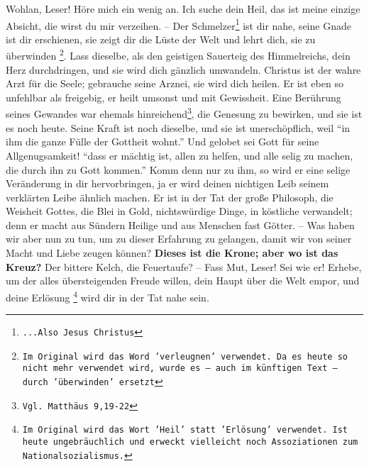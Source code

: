 Wohlan, Leser! Höre mich ein wenig an. Ich suche dein Heil, das ist meine
einzige Absicht, die wirst du mir verzeihen. -- Der Schmelzer\footnote{\texttt{...Also
Jesus Christus}} ist dir nahe, seine Gnade ist dir erschienen, sie zeigt dir die
Lüste der Welt und lehrt dich, sie zu überwinden
\footnote{\texttt{Im Original wird das
Word 'verleugnen' verwendet. Da es heute so nicht mehr verwendet wird, wurde
es -- auch im künftigen Text -- durch 'überwinden' ersetzt}}. Lass dieselbe,
als den geistigen Sauerteig des Himmelreichs, dein Herz durchdringen, und sie
wird dich gänzlich umwandeln. Christus ist der wahre Arzt für die Seele;
gebrauche seine Arznei, sie wird dich heilen. Er ist eben so unfehlbar als
freigebig, er heilt umsonst und mit Gewissheit. Eine Berührung seines Gewandes
war ehemals hinreichend\footnote{\texttt{Vgl. Matthäus 9,19-22}}, die Genesung zu
bewirken, und sie ist es noch heute. Seine Kraft ist noch dieselbe, und sie ist
unerschöpflich, weil "`in ihm die ganze Fülle der Gottheit wohnt."' Und gelobet
sei Gott für seine Allgenugsamkeit! "`dass er mächtig ist, allen zu helfen, und
alle selig zu machen, die durch ihn zu Gott kommen."' Komm denn nur zu ihm, so
wird er eine selige Veränderung in dir hervorbringen, ja er wird deinen
nichtigen Leib seinem verklärten Leibe ähnlich machen. Er ist in der Tat der
große Philosoph, die Weisheit Gottes, die Blei in Gold, nichtswürdige Dinge, in
köstliche verwandelt; denn er macht aus Sündern Heilige und aus Menschen fast
Götter. -- Was haben wir aber nun zu tun, um zu dieser Erfahrung zu gelangen,
damit wir von seiner Macht und Liebe zeugen können? \textbf{Dieses ist die
Krone; aber wo ist das Kreuz?} Der bittere Kelch, die Feuertaufe? -- Fass Mut,
Leser! Sei wie er! Erhebe, um der alles übersteigenden Freude willen, dein Haupt
über die Welt empor, und deine Erlösung \footnote{\texttt{Im Original wird das Wort
'Heil' statt 'Erlösung' verwendet. Ist heute ungebräuchlich und erweckt
vielleicht noch Assoziationen zum Nationalsozialismus.}} wird dir in der Tat
nahe sein.

\medskip

